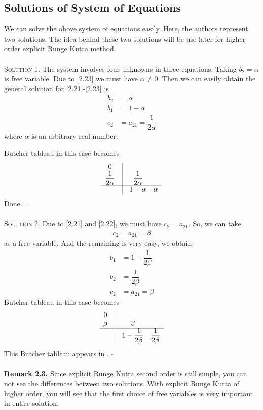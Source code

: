\documentclass[a4paper,oneside]{book}
\numberwithin{equation}{chapter}
\begin{document}
\subsection{Solutions of System of Equations}
We can solve the above system of equations easily. Here, the authors represent two solutions. The idea behind these two solutions will be use later for higher order explicit Runge Kutta method.\\
\\
\textsc{Solution 1.} The system involves four unknowns in three equations. Taking $b_2=\alpha$ is free variable. Due to \eqref{2.23} we must have $\alpha \ne 0$. Then we can easily obtain the general solution for \eqref{2.21}-\eqref{2.23} is
\begin{align}
{b_2} &= \alpha \\
{b_1} &= 1 - \alpha \\
{c_2} &= {a_{21}} = \dfrac{1}{{2\alpha }}
\label{2.26}
\end{align}
where $\alpha$ is an arbitrary real number.

Butcher tableau in this case becomes
\begin{align}
\begin{array}{*{20}{c}}
0&\vline& {}&{}\\
{\dfrac{1}{{2\alpha }}}&\vline& {\dfrac{1}{{2\alpha }}}&{}\\
\hline
{}&\vline& {1 - \alpha }&\alpha 
\end{array}
\end{align}
Done. \hfill $\square$\\
\\
\textsc{Solution 2.} Due to \eqref{2.21} and \eqref{2.22}, we must have $c_2 =a_{21}$. So, we can take
\begin{align}
c_2=a_{21}=\beta
\end{align}
as a free variable. And the remaining is very easy, we obtain 
\begin{align}
{b_1} &= 1 - \dfrac{1}{{2\beta }}\\
{b_2} &= \dfrac{1}{{2\beta }}\\
{c_2} &= {a_{21}} = \beta 
\end{align}
Butcher tableau in this case becomes
\begin{align}
\begin{array}{*{20}{c}}
0&\vline& {}&{}\\
\beta &\vline& \beta &{}\\
\hline
{}&\vline& {1 - \dfrac{1}{{2\beta }}}&{\dfrac{1}{{2\beta }}}
\end{array}
\end{align}
This Butcher tableau appears in \cite{2}. \hfill $\square$\\
\\
\textbf{Remark 2.3.} Since explicit Runge Kutta second order is still simple, you can not see the differences between two solutions. With explicit Runge Kutta of higher order, you will see that the first choice of free variables is very important in entire solution.
\end{document}
